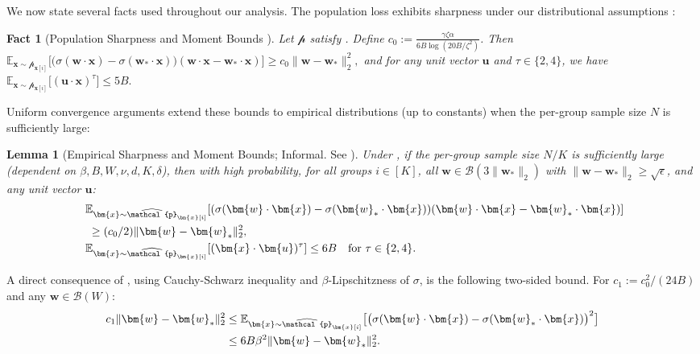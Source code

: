 \documentclass[11pt]{article}
\newcounter{thm}
\numberwithin{thm}{section}
\theoremstyle{plain}
\newtheorem{lemma}[thm]{Lemma}
\newtheorem{fact}[thm]{Fact}
\theoremstyle{definition}
\theoremstyle{remark} \newtheorem{remark}[thm]{Remark}
\def\eps{{\epsilon}}
\def\vu{{\bm{u}}}
\def\vw{{\bm{w}}}
\def\vx{{\bm{x}}}
\def\ep{\widehat{\mathcal{p}}}
\def\pp{{\mathcal{p}}}
\def\cB{{\mathcal{B}}}
\newcommand{\E}{\mathbb{E}}
\begin{document}
We now state several facts used throughout our analysis. 
The population loss exhibits sharpness under our distributional assumptions \citep{wang2023robustly-learning}:

\begin{fact}[Population Sharpness and Moment Bounds {\citep{wang2023robustly-learning}}]\label{fact:sharpness}
Let $\pp$ satisfy . Define
$c_0 := \frac{\gamma \zeta \alpha}{6B\log(20B/\zeta^2)}$.
Then
\( \E_{\vx \sim \pp_{\vx[i]}}\bigl[\bigl(\sigma(\vw \cdot \vx)-\sigma(\vw_* \cdot \vx)\bigr) (\vw \cdot \vx-\vw_* \cdot \vx)\bigr] \ge c_0 \|\vw-\vw_*\|_2^2, \)
and for any unit vector $\vu$ and $\tau \in \{2,4\}$, we have 
$\E_{\vx \sim \pp_{\vx[i]}}\bigl[(\vu \cdot \vx)^\tau\bigr] \le 5B.$
\end{fact}

Uniform convergence arguments extend these bounds to empirical distributions (up to constants) when the per-group sample size $N$ is sufficiently large:

\begin{lemma}[Empirical Sharpness and Moment Bounds; Informal. See ]\label{lemma:sharpness-empirical}
Under , 
if the per-group sample size $N/K$ is sufficiently large (dependent on $\beta, B, W, \nu, d, K, \delta$), then with high probability, for all groups $i \in [K]$, all $\vw \in \cB(3\|\vw_*\|_2)$ with $\|\vw - \vw_*\|_2 \ge \sqrt{\eps}$, and any unit vector $\vu$:
\begin{align}
    \;&\E_{\vx \sim \ep_{\vx[i]}}[(\sigma(\vw \cdot \vx) - \sigma(\vw_* \cdot \vx))(\vw \cdot \vx - \vw_* \cdot \vx)] \notag \\ 
    &\; \ge   (c_0/2)\|\vw - \vw_*\|_2^2, \label{eq:sharpness-empirical} \\
    \;&\E_{\vx \sim \ep_{\vx[i]}}[(\vx \cdot \vu)^{\tau}] \le 6B \quad  \text{for } \tau \in \{2, 4\}. \label{eq:moment-bounds-empirical}
\end{align}
\end{lemma}

A direct consequence of , using Cauchy-Schwarz inequality and $\beta$-Lipschitzness of $\sigma$, is the following two-sided bound. For $c_1 := c_0^2/(24B)$ and any $\vw \in \cB(W)$:
\begin{align}\label{eq:relu-square-bound}
c_1\|\vw-\vw_*\|_2^2 &\le \E_{\vx \sim \ep_{\vx[i]}}\bigl[\bigl(\sigma(\vw \cdot \vx)-\sigma(\vw_* \cdot \vx)\bigr)^2\bigr] \notag \\
&\le 6B\beta^2 \|\vw-\vw_*\|_2^2.
\end{align}
\end{document}
